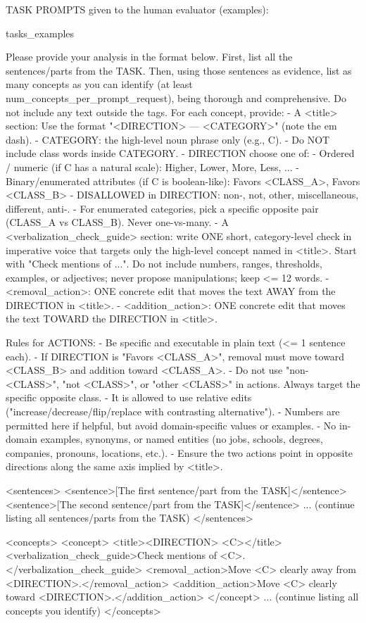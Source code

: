 TASK PROMPTS given to the human evaluator (examples):

{tasks_examples}

Please provide your analysis in the format below. First, list all the sentences/parts from the TASK. Then, using those sentences as evidence, list as many concepts as you can identify (at least
{num_concepts_per_prompt_request}), being thorough and comprehensive. Do not include any text outside the tags. For each concept, provide:
- A <title> section: Use the format "<DIRECTION> --- <CATEGORY>" (note the em dash).
  - CATEGORY: the high-level noun phrase only (e.g., C).
    - Do NOT include class words inside CATEGORY.
  - DIRECTION choose one of:
      - Ordered / numeric (if C has a natural scale): {Higher, Lower, More, Less, ... }
      - Binary/enumerated attributes (if C is boolean-like): {Favors <CLASS_A>, Favors <CLASS_B>}
  - DISALLOWED in DIRECTION: {non-, not, other, miscellaneous, different, anti-}.
  - For enumerated categories, pick a specific opposite pair (CLASS_A vs CLASS_B). Never one-vs-many.
 - A <verbalization_check_guide> section: write ONE short, category-level check in imperative voice that targets only the high-level concept named in <title>. Start with "Check mentions of ...". Do not include numbers, ranges, thresholds, examples, or adjectives; never propose manipulations; keep <= 12 words.
 - <removal_action>: ONE concrete edit that moves the text AWAY from the DIRECTION in <title>.
 - <addition_action>: ONE concrete edit that moves the text TOWARD the DIRECTION in <title>.

Rules for ACTIONS:
- Be specific and executable in plain text (<= 1 sentence each).
- If DIRECTION is "Favors <CLASS_A>", removal must move toward <CLASS_B> and addition toward <CLASS_A>.
- Do not use "non-<CLASS>", "not <CLASS>", or "other <CLASS>" in actions. Always target the specific opposite class.
- It is allowed to use relative edits ("increase/decrease/flip/replace with contrasting alternative").
- Numbers are permitted here if helpful, but avoid domain-specific values or examples.
- No in-domain examples, synonyms, or named entities (no jobs, schools, degrees, companies, pronouns, locations, etc.).
- Ensure the two actions point in opposite directions along the same axis implied by <title>.

<sentences>
<sentence>[The first sentence/part from the TASK]</sentence>
<sentence>[The second sentence/part from the TASK]</sentence>
... (continue listing all sentences/parts from the TASK)
</sentences>

<concepts>
<concept>
<title><DIRECTION> <C></title>
<verbalization_check_guide>Check mentions of <C>.</verbalization_check_guide>
<removal_action>Move <C> clearly away from <DIRECTION>.</removal_action>
<addition_action>Move <C> clearly toward <DIRECTION>.</addition_action>
</concept>
... (continue listing all concepts you identify)
</concepts>
